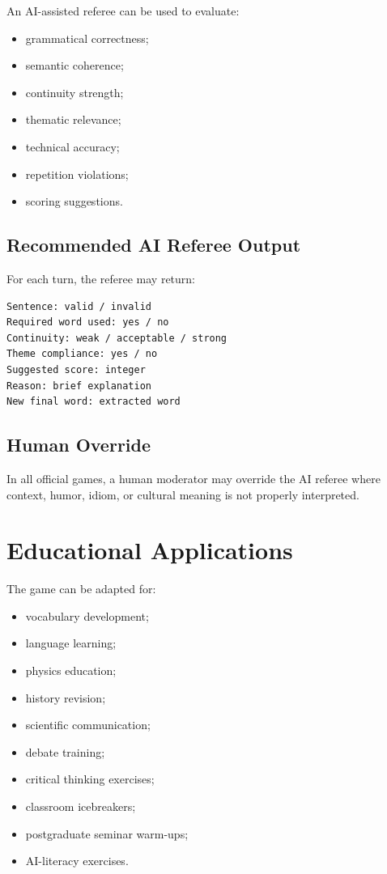 \documentclass[11pt,a4paper]{article}
\begin{document}
An AI-assisted referee can be used to evaluate:

\begin{itemize}
    \item grammatical correctness;
    \item semantic coherence;
    \item continuity strength;
    \item thematic relevance;
    \item technical accuracy;
    \item repetition violations;
    \item scoring suggestions.
\end{itemize}

\subsection{Recommended AI Referee Output}

For each turn, the referee may return:

\begin{verbatim}
Sentence: valid / invalid
Required word used: yes / no
Continuity: weak / acceptable / strong
Theme compliance: yes / no
Suggested score: integer
Reason: brief explanation
New final word: extracted word
\end{verbatim}

\subsection{Human Override}

In all official games, a human moderator may override the AI referee where context, humor, idiom, or cultural meaning is not properly interpreted.

\section{Educational Applications}

The game can be adapted for:

\begin{itemize}
    \item vocabulary development;
    \item language learning;
    \item physics education;
    \item history revision;
    \item scientific communication;
    \item debate training;
    \item critical thinking exercises;
    \item classroom icebreakers;
    \item postgraduate seminar warm-ups;
    \item AI-literacy exercises.
\end{itemize}
\end{document}
